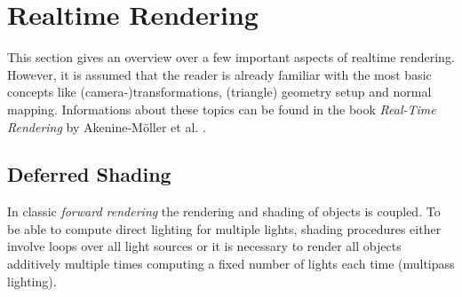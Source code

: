 \documentclass[thesis.tex]{subfiles}
\begin{document}
\section{Realtime Rendering}
This section gives an overview over a few important aspects of realtime rendering.
However, it is assumed that the reader is already familiar with the most basic concepts like (camera-)transformations, (triangle) geometry setup and normal mapping.
Informations about these topics can be found in the book \emph{Real-Time Rendering} by Akenine-M\"{o}ller et al. \cite{bib:RealtimeRenderingBook}. %


\subsection{Deferred Shading}
In classic \emph{forward rendering} the rendering and shading of objects is coupled.
To be able to compute direct lighting for multiple lights, shading procedures either involve loops over all light sources or it is necessary to render all objects additively multiple times computing a fixed number of lights each time (multipass lighting).
\end{document}

